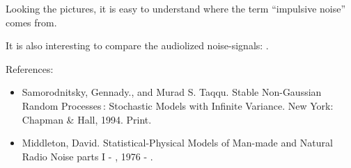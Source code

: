 \documentclass{article}
\begin{document}
Looking the pictures, it is easy to understand where the term ``impulsive noise'' comes from.


It is also interesting to compare the audiolized noise-signals:
.



References:
\begin{itemize}
\item Samorodnitsky, Gennady., and Murad S. Taqqu. Stable Non-Gaussian Random Processes : Stochastic Models with Infinite Variance. New York: Chapman & Hall, 1994. Print.
\item Middleton, David. Statistical-Physical Models of Man-made and Natural Radio Noise parts I - , 1976 - .
\end{itemize}




\end{document}
